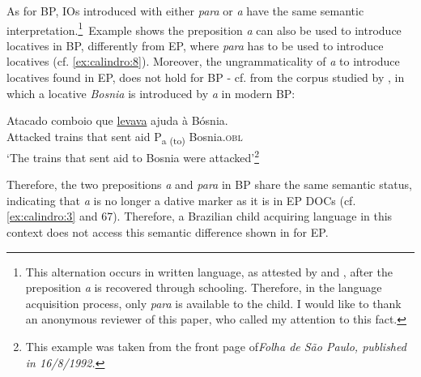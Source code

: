 \documentclass[output=paper,colorlinks,citecolor=brown]{./langscibook}
\begin{document}
As for BP, IOs introduced with either \textit{para} or \textit{a} have the same semantic interpretation.\footnote{This alternation occurs in written language, as attested by \citet{Kato2005} and \citet{Calindro2015}, after the preposition \textit{a} is recovered through schooling. Therefore, in the language acquisition process, only \textit{para} is available to the child. I would like to thank an anonymous reviewer of this paper, who called my attention to this fact.}~Example  shows the preposition \textit{a} can also be used to introduce locatives in BP, differently from EP, where \textit{para} has to be used to introduce locatives (cf. \ref{ex:calindro:8}). Moreover, the ungrammaticality of \textit{a} to introduce locatives found in EP, does not hold for BP -  cf.  from the corpus studied by \citet[115]{Calindro2015}, in which a locative \textit{Bosnia} is introduced by \textit{a} in modern BP:

\ea%
    \label{ex:calindro:14}
    \gll Atacado   comboio que \underline{levava}   ajuda  {à} {Bósnia}.\\
    Attacked  trains       that sent      aid      P{\textsubscript{a (to)}} {Bosnia.\textsc{obl}}\\
    \glt ‘The trains that sent aid  to Bosnia were attacked’\footnote{This example was taken from the front page of\textit{Folha de São Paulo, published in 16/8/1992.} }
    \z

Therefore, the two prepositions \textit{a} and \textit{para} in BP share the same semantic status, indicating that \textit{a} is no longer a dative marker as it is in EP DOCs (cf. \ref{ex:calindro:3} and 67). Therefore, a Brazilian child acquiring language in this context does not access this semantic difference shown in  for EP.
\end{document}
